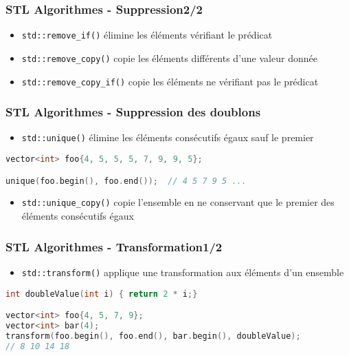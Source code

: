 \documentclass[C++.tex]{subfiles}
\begin{document}
\begin{frame}[fragile]
	\frametitle{STL Algorithmes - Suppression\titlehfill{}2/2}
	\begin{itemize}
		\item \lstinline|std::remove_if()| \og élimine\fg{} les éléments vérifiant le prédicat
		\item \lstinline|std::remove_copy()| copie les éléments différents d'une valeur donnée
		\item \lstinline|std::remove_copy_if()| copie les éléments ne vérifiant pas le prédicat
	\end{itemize}
\end{frame}

\begin{frame}[fragile]
	\frametitle{STL Algorithmes - Suppression des doublons}
	\begin{itemize}
		\item \lstinline|std::unique()| \og élimine\fg{} les éléments consécutifs égaux sauf le premier
	\end{itemize}


	\begin{lstlisting}[language=C++]
vector<int> foo{4, 5, 5, 5, 7, 9, 9, 5};

unique(foo.begin(), foo.end());  // 4 5 7 9 5 ... \end{lstlisting}

	\begin{itemize}
		\item \lstinline|std::unique_copy()| copie l'ensemble en ne conservant que le premier des éléments consécutifs égaux
	\end{itemize}
\end{frame}

\begin{frame}[fragile]
	\frametitle{STL Algorithmes - Transformation\titlehfill{}1/2}
	\begin{itemize}
		\item \lstinline|std::transform()| applique une transformation aux éléments d'un ensemble
	\end{itemize}

	\begin{lstlisting}[language=C++]
int doubleValue(int i) { return 2 * i;}

vector<int> foo{4, 5, 7, 9};
vector<int> bar(4);
transform(foo.begin(), foo.end(), bar.begin(), doubleValue);
// 8 10 14 18\end{lstlisting}
\end{frame}
\end{document}
